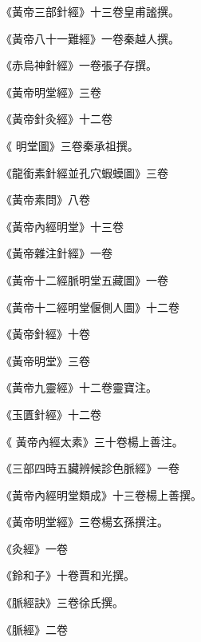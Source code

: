 \begin{pinyinscope}
 《黃帝三部針經》十三卷皇甫謐撰。



 《黃帝八十一難經》一卷秦越人撰。



 《赤烏神針經》一卷張子存撰。



 《黃帝明堂經》三卷



 《黃帝針灸經》十二卷



 《
 明堂圖》三卷秦承祖撰。



 《龍銜素針經並孔穴蝦蟆圖》三卷



 《黃帝素問》八卷



 《黃帝內經明堂》十三卷



 《黃帝雜注針經》一卷



 《黃帝十二經脈明堂五藏圖》一卷



 《黃帝十二經明堂偃側人圖》十二卷



 《黃帝針經》十卷



 《黃帝明堂》三卷



 《黃帝九靈經》十二卷靈寶注。



 《玉匱針經》十二卷



 《
 黃帝內經太素》三十卷楊上善注。



 《三部四時五臟辨候診色脈經》一卷



 《黃帝內經明堂類成》十三卷楊上善撰。



 《黃帝明堂經》三卷楊玄孫撰注。



 《灸經》一卷



 《鈴和子》十卷賈和光撰。



 《脈經訣》三卷徐氏撰。



 《脈經》二卷




\end{pinyinscope}
